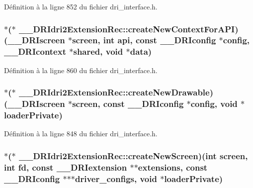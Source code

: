 Définition à la ligne 852 du fichier dri\-\_\-interface.\-h.

\hypertarget{struct_____d_r_idri2_extension_rec_a9221266c6e877cbd5c4dc2be1eff1989}{
\subsubsection[{create\-New\-Context\-For\-A\-P\-I}]{$\ast$($\ast$ \-\_\-\-\_\-\-D\-R\-Idri2\-Extension\-Rec\-::create\-New\-Context\-For\-A\-P\-I)({\bf \-\_\-\-\_\-\-D\-R\-Iscreen} $\ast$screen, int api, const {\bf \-\_\-\-\_\-\-D\-R\-Iconfig} $\ast$config, {\bf \-\_\-\-\_\-\-D\-R\-Icontext} $\ast$shared, {\bf void} $\ast${\bf data})}}\label{struct_____d_r_idri2_extension_rec_a9221266c6e877cbd5c4dc2be1eff1989}


Définition à la ligne 860 du fichier dri\-\_\-interface.\-h.

\hypertarget{struct_____d_r_idri2_extension_rec_ad8dee7e9945357051c9fe893d34f06fe}{
\subsubsection[{create\-New\-Drawable}]{$\ast$($\ast$ \-\_\-\-\_\-\-D\-R\-Idri2\-Extension\-Rec\-::create\-New\-Drawable)({\bf \-\_\-\-\_\-\-D\-R\-Iscreen} $\ast$screen, const {\bf \-\_\-\-\_\-\-D\-R\-Iconfig} $\ast$config, {\bf void} $\ast$loader\-Private)}}\label{struct_____d_r_idri2_extension_rec_ad8dee7e9945357051c9fe893d34f06fe}


Définition à la ligne 848 du fichier dri\-\_\-interface.\-h.

\hypertarget{struct_____d_r_idri2_extension_rec_a5a8c3013e807ff95b7f1b356a0ede411}{
\subsubsection[{create\-New\-Screen}]{$\ast$($\ast$ \-\_\-\-\_\-\-D\-R\-Idri2\-Extension\-Rec\-::create\-New\-Screen)(int screen, int fd, const {\bf \-\_\-\-\_\-\-D\-R\-Iextension} $\ast$$\ast$extensions, const {\bf \-\_\-\-\_\-\-D\-R\-Iconfig} $\ast$$\ast$$\ast$driver\-\_\-configs, {\bf void} $\ast$loader\-Private)}}\label{struct_____d_r_idri2_extension_rec_a5a8c3013e807ff95b7f1b356a0ede411}


